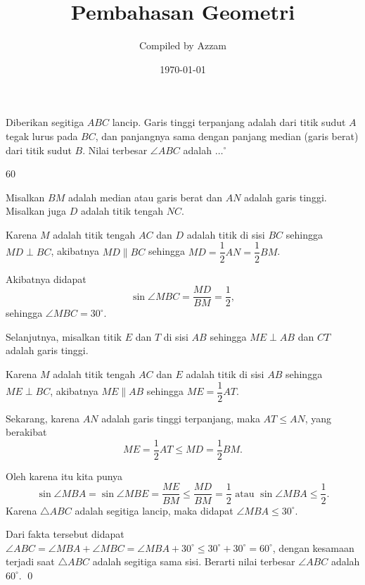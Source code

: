 \documentclass[12pt]{scrartcl}
\begin{document}
	\title{Pembahasan Geometri} %
	\date{\today}
	\author{Compiled by Azzam}
	\maketitle

\renewcommand*\contentsname{Daftar Isi}
\tableofcontents

\newpage
	\newpage

	\begin{soalbaru}
		Diberikan segitiga $ABC$ lancip. Garis tinggi terpanjang adalah dari titik sudut $A$ tegak
			lurus pada $BC$, dan panjangnya sama dengan panjang median (garis berat) dari titik sudut $B$.
			Nilai terbesar $\angle ABC$ adalah $\dots^\circ$
			
			\begin{jawaban}
			60
			\end{jawaban}
			\begin{solusi}
			Misalkan $BM$ adalah median atau garis berat dan $AN$ adalah garis tinggi. Misalkan juga $D$ adalah titik tengah $NC$.
			
			Karena $M$ adalah titik tengah $AC$ dan $D$ adalah titik di sisi $BC$ sehingga $MD \perp BC$, akibatnya $MD \parallel BC$ sehingga $MD=\dfrac{1}{2}AN=\dfrac{1}{2}BM$.
			
			Akibatnya didapat $$\sin \angle MBC = \dfrac{MD}{BM} = \dfrac{1}{2},$$ sehingga $\angle MBC = 30^\circ$.
			
			Selanjutnya, misalkan titik $E$ dan $T$ di sisi $AB$ sehingga $ME \perp AB$ dan $CT$ adalah garis tinggi.
			
			Karena $M$ adalah titik tengah $AC$ dan $E$ adalah titik di sisi $AB$ sehingga $ME \perp BC$, akibatnya $ME \parallel AB$ sehingga $ME=\dfrac{1}{2}AT$.
			
			Sekarang, karena $AN$ adalah garis tinggi terpanjang, maka $AT \le AN$, yang berakibat $$ME=\dfrac{1}{2}AT \le MD=\dfrac{1}{2}BM.$$
			
			Oleh karena itu kita punya $$\sin \angle MBA = \sin \angle MBE = \dfrac{ME}{BM} \le \dfrac{MD}{BM} = \dfrac{1}{2} \text{ atau } \sin \angle MBA \le \dfrac{1}{2}.$$ 
			Karena $\triangle ABC$ adalah segitiga lancip, maka didapat $\angle MBA \le 30^\circ$.
			
			Dari fakta tersebut didapat $\angle ABC = \angle MBA + \angle MBC = \angle MBA  + 30^\circ \le 30^\circ + 30^\circ = 60^\circ$, dengan kesamaan terjadi saat $\triangle ABC$ adalah segitiga sama sisi. Berarti nilai terbesar $\angle ABC$ adalah $60^\circ$. \qed
			\end{solusi}
	\end{soalbaru}
	
\end{document}
